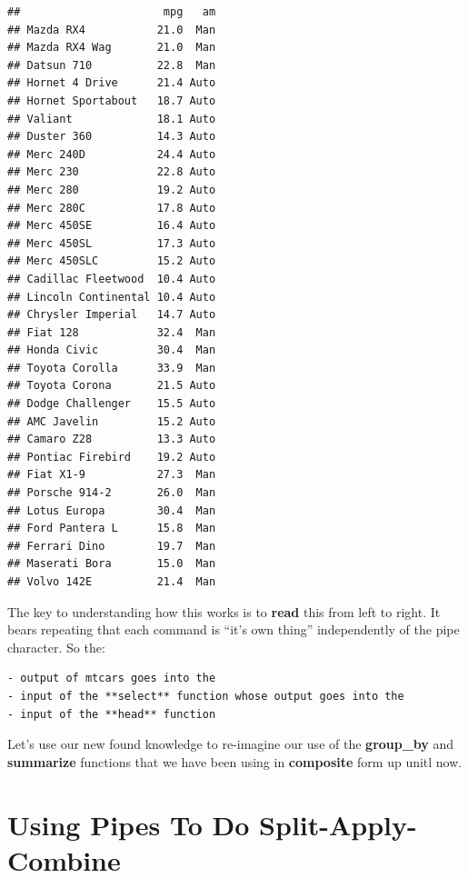 \documentclass[]{book}
\newenvironment{Shaded}{\begin{snugshade}}{\end{snugshade}}
\newcommand{\DataTypeTok}[1]{\textcolor[rgb]{0.13,0.29,0.53}{#1}}
\newcommand{\KeywordTok}[1]{\textcolor[rgb]{0.13,0.29,0.53}{\textbf{#1}}}
\newcommand{\NormalTok}[1]{#1}
\newcommand{\OperatorTok}[1]{\textcolor[rgb]{0.81,0.36,0.00}{\textbf{#1}}}
\newcommand{\StringTok}[1]{\textcolor[rgb]{0.31,0.60,0.02}{#1}}
\begin{document}
\begin{verbatim}
##                      mpg   am
## Mazda RX4           21.0  Man
## Mazda RX4 Wag       21.0  Man
## Datsun 710          22.8  Man
## Hornet 4 Drive      21.4 Auto
## Hornet Sportabout   18.7 Auto
## Valiant             18.1 Auto
## Duster 360          14.3 Auto
## Merc 240D           24.4 Auto
## Merc 230            22.8 Auto
## Merc 280            19.2 Auto
## Merc 280C           17.8 Auto
## Merc 450SE          16.4 Auto
## Merc 450SL          17.3 Auto
## Merc 450SLC         15.2 Auto
## Cadillac Fleetwood  10.4 Auto
## Lincoln Continental 10.4 Auto
## Chrysler Imperial   14.7 Auto
## Fiat 128            32.4  Man
## Honda Civic         30.4  Man
## Toyota Corolla      33.9  Man
## Toyota Corona       21.5 Auto
## Dodge Challenger    15.5 Auto
## AMC Javelin         15.2 Auto
## Camaro Z28          13.3 Auto
## Pontiac Firebird    19.2 Auto
## Fiat X1-9           27.3  Man
## Porsche 914-2       26.0  Man
## Lotus Europa        30.4  Man
## Ford Pantera L      15.8  Man
## Ferrari Dino        19.7  Man
## Maserati Bora       15.0  Man
## Volvo 142E          21.4  Man
\end{verbatim}

The key to understanding how this works is to \textbf{read} this from left to right. It bears repeating that each command is ``it's own thing'' independently of the pipe character. So the:

\begin{verbatim}
- output of mtcars goes into the 
- input of the **select** function whose output goes into the
- input of the **head** function
\end{verbatim}

Let's use our new found knowledge to re-imagine our use of the \textbf{group\_by} and \textbf{summarize} functions that we have been using in \textbf{composite} form up unitl now.

\hypertarget{using-pipes-to-do-split-apply-combine}{%
\section{Using Pipes To Do Split-Apply-Combine}\label{using-pipes-to-do-split-apply-combine}}

\begin{Shaded}
\end{Shaded}
\end{document}
